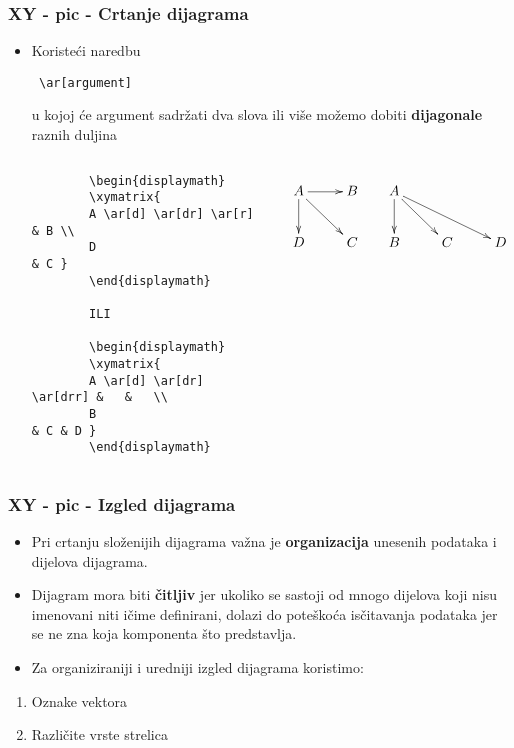 \documentclass[9pt]{beamer}
\begin{document}
\begin{frame}[fragile]
\frametitle{XY - pic - Crtanje dijagrama}

\begin{itemize}
	\item Koristeći naredbu \begin{verbatim} \ar[argument] \end{verbatim} u kojoj će argument sadržati dva slova 
	ili više možemo dobiti \textbf{dijagonale} raznih duljina
	\begin{columns}
		\begin{verbatim} 
		\begin{displaymath}
		\xymatrix{
		A \ar[d] \ar[dr] \ar[r] & B \\
		D                       & C }
		\end{displaymath}
		
		ILI
		
		\begin{displaymath}
		\xymatrix{
		A \ar[d] \ar[dr] \ar[drr] &   &   \\
		B                         & C & D }
		\end{displaymath}                     
		\end{verbatim}
		
		\begin{displaymath}
		\xymatrix{
			A \ar[d] \ar[dr] \ar[r] & B \\
			D                       & C }
		\end{displaymath}
		
		\begin{displaymath}
		\xymatrix{
			A \ar[d] \ar[dr] \ar[drr] &   &   \\
			B                         & C & D }
		\end{displaymath} 
	\end{columns}
\end{itemize}
\end{frame}

\begin{frame}[fragile]
\frametitle{XY - pic - Izgled dijagrama}

\begin{itemize}
	\item Pri crtanju složenijih dijagrama važna je \textbf{organizacija} unesenih podataka i dijelova dijagrama. 
	\item Dijagram mora biti \textbf{čitljiv} jer ukoliko se sastoji od mnogo dijelova koji nisu imenovani niti ičime definirani, dolazi do poteškoća isčitavanja podataka jer se ne zna koja komponenta što predstavlja. 
	\item Za organiziraniji i uredniji izgled dijagrama koristimo:
\end{itemize}
\begin{enumerate}
	\item Oznake vektora
	\item Različite vrste strelica
\end{enumerate}
\end{frame}
\end{document}
